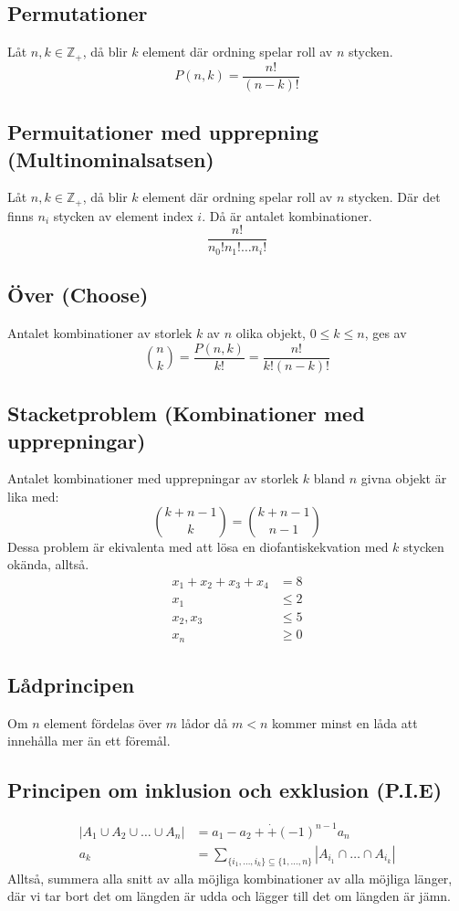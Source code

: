 \documentclass{article}
\begin{document}
	\subsection{Permutationer}
	Låt $n, k \in \mathbb{Z}_+$, då blir $k$ element där ordning spelar roll av $n$ stycken.
	$$
		P(n, k) = \frac{n!}{(n - k)!}
	$$

	\subsection{Permuitationer med upprepning (Multinominalsatsen)}
	Låt $n, k \in \mathbb{Z}_+$, då blir $k$ element där ordning spelar roll av $n$ stycken. Där det finns $n_i$ stycken av element index $i$. Då är antalet kombinationer.
	$$
		\frac{n!}{n_0!n_1!\dots n_i!}
	$$
		
	\subsection{Över (Choose)}
	Antalet kombinationer av storlek $k$ av $n$ olika objekt, $0 \le k \le n$, ges av
	$$
		{n \choose k} = \frac{P(n, k)}{k!} = \frac{n!}{k!(n - k)!}
	$$

	\subsection{Stacketproblem (Kombinationer med upprepningar)}
	Antalet kombinationer med upprepningar av storlek $k$ bland $n$ givna objekt är lika med:
	$$
		{k + n - 1 \choose k} = {k + n - 1 \choose n - 1}
	$$
	Dessa problem är ekivalenta med att lösa en diofantiskekvation med $k$ stycken okända, alltså.
	\begin{align*}
		x_1 + x_2 + x_3 + x_4 &= 8\\
		x_1 &\le 2\\
		x_2, x_3 &\le 5\\
		x_n &\ge 0
	\end{align*}

	\subsection{Lådprincipen}
	Om $n$ element fördelas över $m$ lådor då $m < n$ kommer minst en låda att innehålla mer än ett föremål.

	\subsection{Principen om inklusion och exklusion (P.I.E)}
	\begin{align*}
		|A_1 \cup A_2 \cup \dots \cup A_n| &= a_1 - a_2 + \dot + (-1)^{n-1}a_n\\
		a_k &= \sum_{\{i_1, \dots , i_k\} \subseteq \{1, \dots, n\}} |A_{i_1} \cap \dots \cap A_{i_k}|
	\end{align*}
	Alltså, summera alla snitt av alla möjliga kombinationer av alla möjliga länger, där vi tar bort det om längden är udda och lägger till det om längden är jämn.
\end{document}
